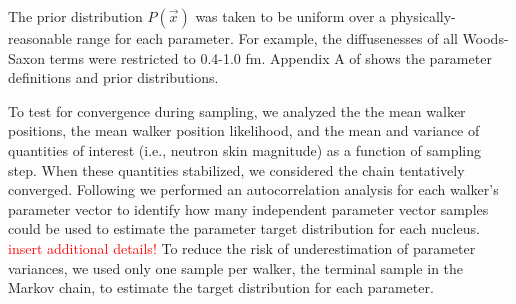 \documentclass[twocolumn,secnumarabic,amssymb, nobibnotes, aps, prl,
superscriptaddress, nobalancelastpage]{revtex4}
\begin{document}
The prior distribution $P(\vec{x})$ was taken to be uniform over a
physically-reasonable range for each parameter. For example, the
diffusenesses of all Woods-Saxon terms were restricted to 0.4-1.0 fm.
Appendix A of \cite{Pruitt2020PRC} shows the parameter definitions and prior distributions.

To test for convergence during sampling, we analyzed the
the mean walker positions, the mean walker
position likelihood, and the mean and variance of quantities of
interest (i.e., neutron skin magnitude) as a function of sampling step.
When these quantities stabilized, we considered the chain tentatively
converged. Following \cite{Foreman-Mackey2013} we performed an
autocorrelation analysis for each walker's parameter vector
to identify how many independent parameter vector samples could be used
to estimate the parameter target distribution for each nucleus.
\textcolor{red}{insert additional details!} To reduce the risk of underestimation of
parameter variances, we used only one sample per walker,
the terminal sample in the Markov chain, to estimate the target distribution for
each parameter.
\end{document}
